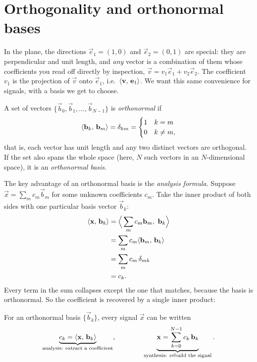 \section{Orthogonality and orthonormal bases}
\label{ch03:ortho}

In the plane, the directions $\vec{e}_1=(1,0)$ and $\vec{e}_2=(0,1)$ are special: they are
perpendicular and unit length, and \emph{any} vector is a combination of them whose coefficients you
read off directly by inspection, $\vec{v}=v_1\vec{e}_1+v_2\vec{e}_2$. The coefficient $v_1$ is the
projection of $\vec{v}$ onto $\vec{e}_1$, i.e.\ $\langle \mathbf{v},\, \mathbf{e}_1 \rangle$. We want this same
convenience for signals, with a basis we get to choose.

\begin{definition}
\label{ch03:def-onb}
A set of vectors $\{\vec{b}_0,\vec{b}_1,\dots,\vec{b}_{N-1}\}$ is \emph{orthonormal} if
\[
  \langle \mathbf{b}_k,\, \mathbf{b}_m \rangle = \delta_{km} =
  \begin{cases} 1 & k=m \\ 0 & k\neq m, \end{cases}
\]
that is, each vector has unit length and any two distinct vectors are orthogonal. If the set also
spans the whole space (here, $N$ such vectors in an $N$-dimensional space), it is an
\emph{orthonormal basis}.
\end{definition}

The key advantage of an orthonormal basis is the \emph{analysis formula}. Suppose
$\vec{x}=\sum_m c_m \vec{b}_m$ for some unknown coefficients $c_m$. Take the inner product of both
sides with one particular basis vector $\vec{b}_k$:
\begin{align*}
  \langle \mathbf{x},\, \mathbf{b}_k \rangle
  &= \Big\langle \sum_m c_m \mathbf{b}_m,\ \mathbf{b}_k \Big\rangle \\
  &= \sum_m c_m \langle \mathbf{b}_m,\, \mathbf{b}_k \rangle \\
  &= \sum_m c_m\,\delta_{mk} \\
  &= c_k .
\end{align*}
Every term in the sum collapses except the one that matches, because the basis is orthonormal. So
the coefficient is recovered by a single inner product:

\begin{theorem}
\label{ch03:thm-analysis}
For an orthonormal basis $\{\vec{b}_k\}$, every signal $\vec{x}$ can be written
\[
  \underbrace{c_k = \langle \mathbf{x},\, \mathbf{b}_k \rangle}_{\text{analysis: extract a coefficient}},
  \qquad\qquad
  \underbrace{\mathbf{x} = \sum_{k=0}^{N-1} c_k\,\mathbf{b}_k}_{\text{synthesis: rebuild the signal}} .
\]
\end{theorem}

